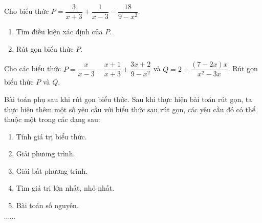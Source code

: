 \begin{vd}
	Cho biểu thức $P=\dfrac{3}{x+3}+\dfrac{1}{x-3}-\dfrac{18}{9-x^2}$.
	\begin{enumerate}
		\item Tìm điều kiện xác định của $P$.
		\item Rút gọn biểu thức $P$.
	\end{enumerate}
\end{vd}
\begin{vd}
Cho các biểu thức $P=\dfrac{x}{x-3} - \dfrac{x+1}{x+3}+\dfrac{3x+2}{9-x^2}$ và $Q= 2+ \dfrac{(7-2x)x}{x^2-3x}$.
Rút gọn biểu thức $P$ và $Q$. 
\end{vd}
\begin{dang}{Bài toán phụ sau khi rút gọn biểu thức.}
   Sau khi thực hiện bài toán rút gọn, ta thực hiện thêm một số yêu cầu với biểu thức sau rút gọn, các yêu cầu đó có thể thuộc một trong các dạng sau:
    \begin{enumerate}[Dạng 1:]
    	\item Tính giá trị biểu thức.
    	\item Giải phương trình.
    	\item Giải bất phương trình.
    	\item Tìm giá trị lớn nhất, nhỏ nhất.
    	\item Bài toán số nguyên.
    \end{enumerate}
	$\cdots \cdots$
\end{dang}
